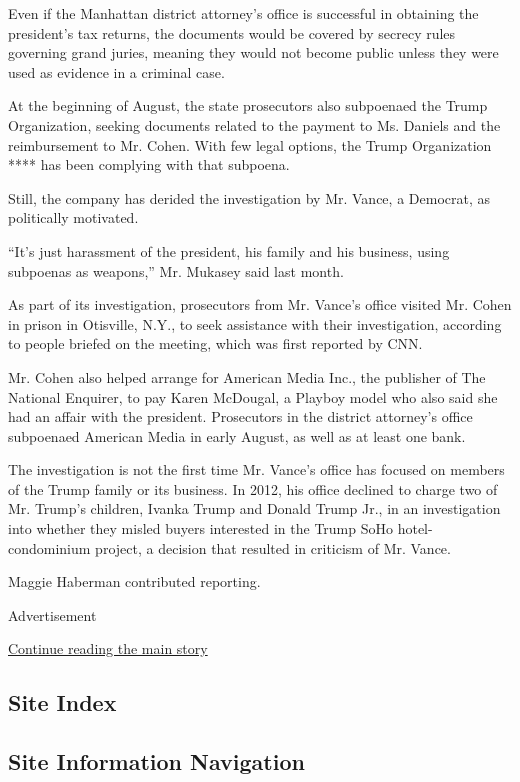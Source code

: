 Even if the Manhattan district attorney's office is successful in
obtaining the president's tax returns, the documents would be covered by
secrecy rules governing grand juries, meaning they would not become
public unless they were used as evidence in a criminal case.

At the beginning of August, the state prosecutors also subpoenaed the
Trump Organization, seeking documents related to the payment to Ms.
Daniels and the reimbursement to Mr. Cohen. With few legal options, the
Trump Organization **** has been complying with that subpoena.

Still, the company has derided the investigation by Mr. Vance, a
Democrat, as politically motivated.

``It's just harassment of the president, his family and his business,
using subpoenas as weapons,'' Mr. Mukasey said last month.

As part of its investigation, prosecutors from Mr. Vance's office
visited Mr. Cohen in prison in Otisville, N.Y., to seek assistance with
their investigation, according to people briefed on the meeting, which
was first reported by CNN.

Mr. Cohen also helped arrange for American Media Inc., the publisher of
The National Enquirer, to pay Karen McDougal, a Playboy model who also
said she had an affair with the president. Prosecutors in the district
attorney's office subpoenaed American Media in early August, as well as
at least one bank.

The investigation is not the first time Mr. Vance's office has focused
on members of the Trump family or its business. In 2012, his office
declined to charge two of Mr. Trump's children, Ivanka Trump and Donald
Trump Jr., in an investigation into whether they misled buyers
interested in the Trump SoHo hotel-condominium project, a decision that
resulted in criticism of Mr. Vance.

Maggie Haberman contributed reporting.

Advertisement

\protect\hyperlink{after-bottom}{Continue reading the main story}

\hypertarget{site-index}{%
\subsection{Site Index}\label{site-index}}

\hypertarget{site-information-navigation}{%
\subsection{Site Information
Navigation}\label{site-information-navigation}}

